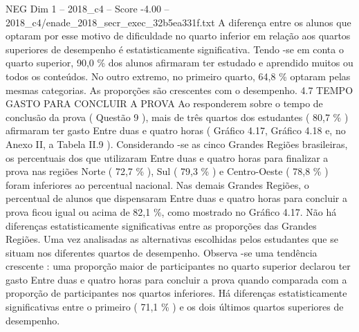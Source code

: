 \begin{textsample}{NEG Dim 1 – 2018\_c4 – Score -4.00 – 2018\_c4/enade\_2018\_secr\_exec\_32b5ea331f.txt}
A diferença entre os alunos que optaram por esse motivo de dificuldade no quarto inferior em relação aos quartos superiores de desempenho é estatisticamente significativa.
Tendo -se em conta o quarto superior, 90,0 \% dos alunos afirmaram ter estudado e aprendido muitos ou todos os conteúdos.
No outro extremo, no primeiro quarto, 64,8 \% optaram pelas mesmas categorias.
As proporções são crescentes com o desempenho. 4.7 TEMPO GASTO PARA CONCLUIR A PROVA Ao responderem sobre o tempo de conclusão da prova ( Questão 9 ), mais de três quartos dos estudantes ( 80,7 \% ) afirmaram ter gasto Entre duas e quatro horas ( Gráfico 4.17, Gráfico 4.18 e, no Anexo II, a Tabela II.9 ).
Considerando -se as cinco Grandes Regiões brasileiras, os percentuais dos que utilizaram Entre duas e quatro horas para finalizar a prova nas regiões Norte ( 72,7 \% ), Sul ( 79,3 \% ) e Centro-Oeste ( 78,8 \% ) foram inferiores ao percentual nacional.
Nas demais Grandes Regiões, o percentual de alunos que dispensaram Entre duas e quatro horas para concluir a prova ficou igual ou acima de 82,1 \%, como mostrado no Gráfico 4.17.
Não há diferenças estatisticamente significativas entre as proporções das Grandes Regiões.
Uma vez analisadas as alternativas escolhidas pelos estudantes que se situam nos diferentes quartos de desempenho.
Observa -se uma tendência crescente : uma proporção maior de participantes no quarto superior declarou ter gasto Entre duas e quatro horas para concluir a prova quando comparada com a proporção de participantes nos quartos inferiores.
Há diferenças estatisticamente significativas entre o primeiro ( 71,1 \% ) e os dois últimos quartos superiores de desempenho.

\end{textsample}
